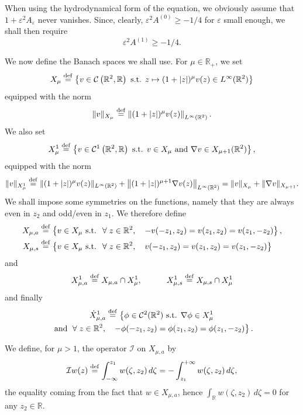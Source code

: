\documentclass[10pt]{amsart}
\theoremstyle{definition}\newtheorem{defi}[theo]{Definition}\newtheorem{rema}[theo]{Remark}\newtheorem{exam}[theo]{Example}\newtheorem{exem}[theo]{Example}\newtheorem{nota}[theo]{Notation}
\newcommand*\R{\mathbb R}
\newcommand*\ddef{\stackrel{\rm def}{=}}
\newcommand*\BC{\mathcal{C}}
\newcommand*\BI{\mathcal{I}}
\newcommand*\ii{\infty}
\newcommand*\gs{\geqslant }
\newcommand*\e{\varepsilon}
\let\oldforall\forall
\renewcommand*{\forall}{\mathrel{\oldforall}}
\begin{document}
When using the hydrodynamical form of the equation, we obviously assume that $ 1 + \e^2 A_\e $ never vanishes. Since, clearly, $ \e^2 A^{(0)} \gs -1/4 $ for $ \e $ small enough, we shall then require
\begin{equation}\label{farwest}
\e^2 A^{(1)} \gs - 1/4.
\end{equation}


We now define the Banach spaces we shall use. For $ \mu \in \R_+ $, we set
\[
X_{\mu } \ddef \left\{ v \in \BC \left(\R^2, \R\right) \text{ s.t. } z \mapsto (1 + |z|)^\mu v(z) \in L^\ii (\R^2) \right\}
\]
equipped with the norm
\[
\| v \|_{X_\mu} \ddef \left\| (1 + |z|)^\mu v(z) \right\|_{ L^\ii (\R^2) }.
\]
We also set
\[
X^1_\mu \ddef \left\{ v \in \BC^1 \left(\R^2, \R\right) \text{ s.t. } v \in X_\mu \text{ and } \nabla v \in X_{\mu +1 } (\R^2) \right\},
\]
equipped with the norm
\[
\| v \|_{X^1_{\mu}} \ddef
\| (1 + |z|)^\mu v(z) \|_{ L^\ii (\R^2) } + \left\| (1 + |z|)^{\mu+1} \nabla v(z) \right\|_{ L^\ii (\R^2) } = \| v \|_{X_\mu} + \| \nabla v \|_{X_{ \mu +1}}.
\]
We shall impose some symmetries on the functions, namely that they are always even in $ z_2 $ and odd/even in $z_1$. We therefore define
\begin{align*}
X_{\mu, a} &\ddef \left\{ v \in X_\mu \text{ s.t. } \forall z \in \R^2, \quad - v(-z_1,z_2) = v(z_1, z_2) = v(z_1, - z_2) \right\},
\\
X_{\mu, s} &\ddef \left\{ v \in X_\mu \text{ s.t. } \forall z \in \R^2, \quad v(- z_1,z_2) = v(z_1, z_2) = v(z_1, - z_2) \right\}
\end{align*}
and
\[
X^1_{\mu, a} \ddef X_{\mu, a} \cap X^1_{\mu },
\quad \quad \quad X^1_{\mu, s} \ddef X_{\mu, s} \cap X^1_{\mu }
\]
and finally
\begin{multline*}
\dot{X}^1_{\mu, a } \ddef
\left\{ \phi \in \BC^2 (\R^2) \text{ s.t. } \nabla \phi \in X^1_\mu\right.
\\
\left.\text{ and }
\forall z \in \R^2, \quad - \phi (- z_1, z_2) = \phi (z_1, z_2) = \phi (z_1, - z_2)
\right\}.
\end{multline*}

We define, for $ \mu > 1 $, the operator $ \BI $ on $ X_{\mu,a} $ by
\begin{equation}\label{def_I}
\BI w (z)
\ddef \int_{-\ii}^{z_1} w (\zeta, z_2) \, d\zeta = - \int_{z_1}^{+\ii} w (\zeta, z_2) \, d\zeta,
\end{equation} the equality coming from the fact that $ w \in X_{\mu,a} $, hence $ \int_\R w (\zeta, z_2) \, d\zeta = 0 $ for any $ z_2 \in \R $.
\end{document}
